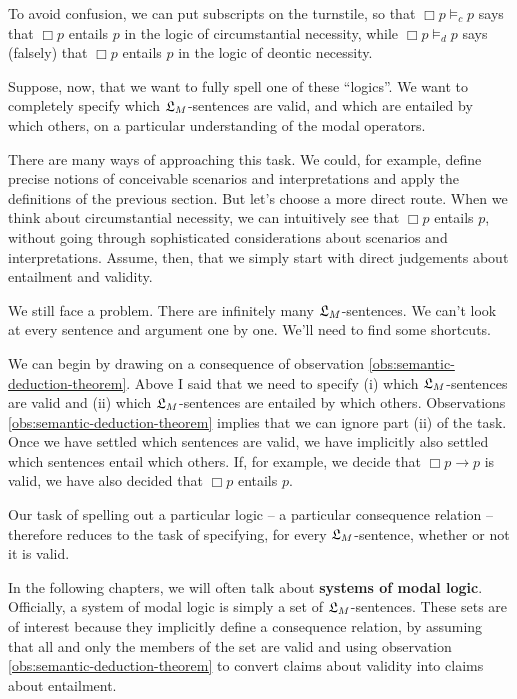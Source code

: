 To avoid confusion, we can put subscripts on the turnstile, so that
$\Box p \models_{c} p$ says that $\Box p$ entails $p$ in the logic of
circumstantial necessity, while $\Box p \models_{d} p$ says (falsely) that
$\Box p$ entails $p$ in the logic of deontic necessity.

Suppose, now, that we want to fully spell one of these ``logics''. We want to
completely specify which $\mathfrak{L}_{M}$-sentences are valid, and which are entailed by
which others, on a particular understanding of the modal operators.

There are many ways of approaching this task. We could, for example, define
precise notions of conceivable scenarios and interpretations and apply the
definitions of the previous section. But let's choose a more direct route. When
we think about circumstantial necessity, we can intuitively see that $\Box p$
entails $p$, without going through sophisticated considerations about scenarios
and interpretations. Assume, then, that we simply start with direct judgements
about entailment and validity.

We still face a problem. There are infinitely many $\mathfrak{L}_{M}$-sentences. We can't
look at every sentence and argument one by one. We'll need to find some
shortcuts.

We can begin by drawing on a consequence of observation
\ref{obs:semantic-deduction-theorem}. Above I said that we need to specify (i)
which $\mathfrak{L}_{M}$-sentences are valid and (ii) which $\mathfrak{L}_{M}$-sentences are
entailed by which others. Observations \ref{obs:semantic-deduction-theorem}
implies that we can ignore part (ii) of the task. Once we have settled which
sentences are valid, we have implicitly also settled which sentences entail
which others. If, for example, we decide that $\Box p \to p$ is valid, we have
also decided that $\Box p$ entails $p$.

Our task of spelling out a particular logic -- a particular consequence relation
-- therefore reduces to the task of specifying, for every $\mathfrak{L}_{M}$-sentence,
whether or not it is valid.

In the following chapters, we will often talk about \textbf{systems of modal
  logic}. Officially, a system of modal logic is simply a set of
$\mathfrak{L}_{M}$-sentences. These sets are of interest because they implicitly define a
consequence relation, by assuming that all and only the members of the set are
valid and using observation \ref{obs:semantic-deduction-theorem} to convert
claims about validity into claims about entailment.

